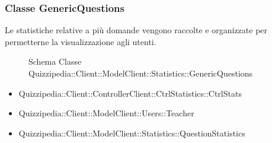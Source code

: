 \subsubsection{Classe GenericQuestions}
Le statistiche relative a più domande vengono raccolte e organizzate per permetterne la visualizzazione agli utenti.
\begin{figure}[H]
\centering
\noindent{}
\caption[Schema Classe GenericQuestions]{Schema Classe Quizzipedia::Client::ModelClient::Statistics::GenericQuestions}
\end{figure}
\begin{itemize}
\item Quizzipedia::Client::ControllerClient::CtrlStatistics::CtrlStats
\item Quizzipedia::Client::ModelClient::Users::Teacher
\end{itemize}
\begin{itemize}
\item Quizzipedia::Client::ModelClient::Statistics::QuestionStatistics
\end{itemize}
